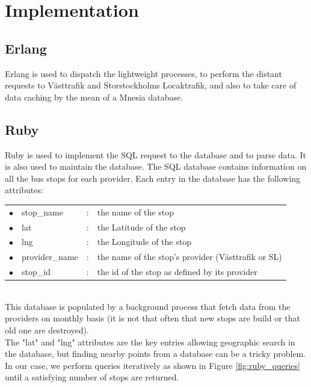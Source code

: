 \clearpage

\section{Implementation}


\subsection{Erlang}

Erlang is used to dispatch the lightweight processes, to perform the distant requests to Västtrafik and Storstockholms Locaktrafik, and also to take care of data caching by the mean of a Mnesia database.

\subsection{Ruby}

Ruby is used to implement the SQL request to the database and to parse data. It is also used to maintain the database. The SQL database contains information on all the bus stops for each provider. Each entry in the database has the following attributes:

\begin{tabular}{ l l l l }
$\bullet$ & stop\_name 	& : & the name of the stop\\
$\bullet$ & lat 			& : & the Latitude of the stop\\
$\bullet$ & lng 			& : & the Longitude of the stop\\
$\bullet$ & provider\_name & : & the name of the stop's provider (Västtrafik or SL)\\
$\bullet$ & stop\_id 		& : & the id of the stop as defined by its provider\\
\end{tabular}\\

This database is populated by a background process that fetch data from the providers on monthly basis (it is not that often that new stops are build or that old one are destroyed).\\

The "lat" and "lng" attributes are the key entries allowing geographic search in the database, but finding nearby points from a database can be a tricky problem. In our case, we perform queries iteratively as shown in Figure \ref{fig:ruby_queries} until a satisfying number of stops are returned.

